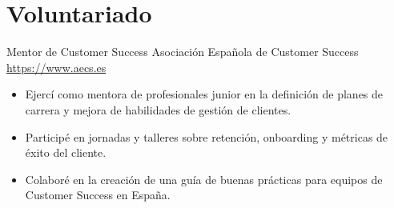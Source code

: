 \documentclass[a4paper, serif, 10pt]{moderncv}
\begin{document}
\section{Voluntariado}

        {Mentor de Customer Success}
        {Asociación Española de Customer Success}
        {\url{https://www.aecs.es}}
        {}
        {\begin{itemize}
\item Ejercí como mentora de profesionales junior en la definición de planes de carrera y mejora de habilidades de gestión de clientes.
\item Participé en jornadas y talleres sobre retención, onboarding y métricas de éxito del cliente.
\item Colaboré en la creación de una guía de buenas prácticas para equipos de Customer Success en España.
\end{itemize}}
    
\end{document}
